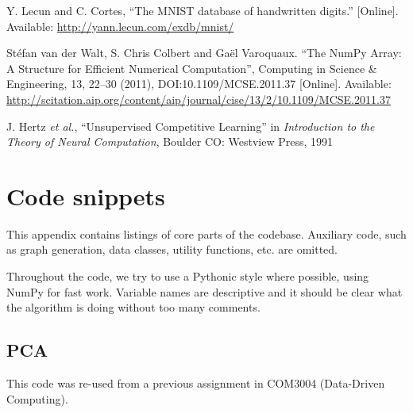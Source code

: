 \documentclass[a4paper, 11pt, twocolumn, final]{article} %
\begin{document}
\begin{thebibliography}{9}
  Y. Lecun and C. Cortes,
  ``The MNIST database of handwritten digits.''
  [Online].
  Available: \url{http://yann.lecun.com/exdb/mnist/}

  Stéfan van der Walt, S. Chris Colbert and Gaël Varoquaux.
  ``The NumPy Array: A Structure for Efficient Numerical Computation'',
  Computing in Science \& Engineering, 13, 22--30 (2011),
  DOI:10.1109/MCSE.2011.37
  [Online].
  Available: \url{http://scitation.aip.org/content/aip/journal/cise/13/2/10.1109/MCSE.2011.37}

  J. Hertz \textit{et al.},
  ``Unsupervised Competitive Learning''
  in \textit{Introduction to the Theory of Neural Computation},
  Boulder CO: Westview Press,
  1991

\end{thebibliography}

\appendix \section{Code snippets} \label{sec:code} This appendix contains
listings of core parts of the codebase.  Auxiliary code, such as graph
generation, data classes, utility functions, etc. are omitted.

Throughout the code, we try to use a Pythonic style where possible, using NumPy
for fast work. Variable names are descriptive and it should be clear what the
algorithm is doing without too many comments.

\subsection{PCA} This code was re-used from a previous assignment in COM3004
(Data-Driven Computing).
\end{document}
